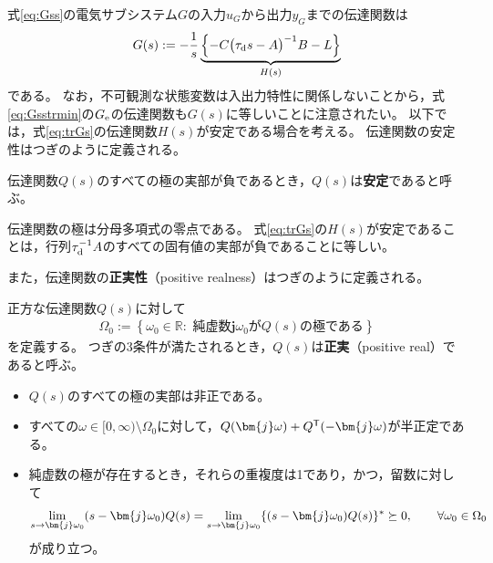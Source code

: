 \documentclass[tombow,dvipdfmx]{corona-a5-1.1}
\begin{document}
式\ref{eq:Gss}の電気サブシステム$G$の入力$u_G$から出力$y_G$までの伝達関数は
\begin{align}\label{eq:trGs}
G(s) :=  - \frac{1}{s} 
\underbrace{
\left\{ -C \bigl( \tau_{\rm d} s -A \bigr)^{-1} B - L \right\}
}_{H(s)}
\end{align}
である。
なお，不可観測な状態変数は入出力特性に関係しないことから，式\ref{eq:Gsstrmin}の$G_{\rm e}$の伝達関数も$G(s)$に等しいことに注意されたい。
以下では，式\ref{eq:trGs}の伝達関数$H(s)$が安定である場合を考える。
伝達関数の安定性はつぎのように定義される。

\begin{定義}[伝達関数の安定性]\label{def:trsta}
伝達関数$Q(s)$のすべての極の実部が負であるとき，$Q(s)$は\textbf{安定}であると呼ぶ。
\end{定義}

伝達関数の極は分母多項式の零点である。
式\ref{eq:trGs}の$H(s)$が安定であることは，行列$\tau_{\rm d}^{-1}A$のすべての固有値の実部が負であることに等しい。

また，伝達関数の\textbf{正実性}（positive realness）はつぎのように定義される。

\begin{定義}[伝達関数の正実性]\label{def:trpf}
正方な伝達関数$Q(s)$に対して
\begin{align}\label{eq:defOm0}
\Omega_0 := \left\{
\omega_0 \in \mathbb{R}: 
\mbox{ 純虚数$\bm{j} \omega_0$が$Q(s)$の極である}
\right\}
\end{align}
を定義する。
つぎの3条件が満たされるとき，$Q(s)$は\textbf{正実}（positive real）であると呼ぶ。
\begin{itemize}
\item $Q(s)$のすべての極の実部は非正である。
\item すべての$\omega \in [0,\infty)\setminus \Omega_0$に対して，$Q(\bm{j} \omega) + Q^{\sf T}(-\bm{j} \omega)$が半正定である。
\item 純虚数の極が存在するとき，それらの重複度は1であり，かつ，留数に対して
\begin{align*}
\lim_{s \rightarrow \bm{j} \omega_0} (s-\bm{j} \omega_0) Q(s) = \lim_{s\rightarrow \bm{j} \omega_0} \{ (s-\bm{j} \omega_0) Q(s)\}^{\sf *}\succeq 0
,\qquad
\forall \omega_0 \in \Omega_0
\end{align*}
が成り立つ。
\end{itemize}
\end{定義}
\end{document}
